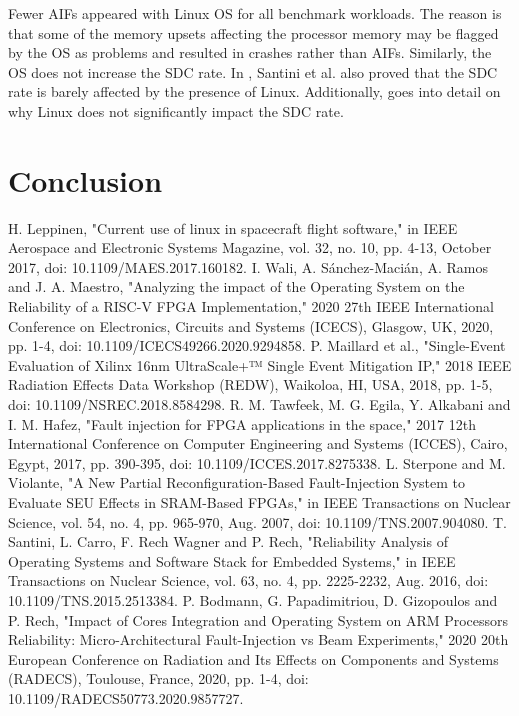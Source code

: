 \documentclass[conference]{IEEEtran}
\begin{document}
Fewer AIFs appeared with Linux OS for all benchmark workloads. The reason is that some of the memory upsets affecting the processor memory 
may be flagged by the OS as problems and resulted in crashes rather than AIFs. Similarly, the OS does not increase the SDC rate. In \cite{b6}, 
Santini et al. also proved that the SDC rate is barely affected by the presence of Linux. Additionally, \cite{b7} goes into detail on why
Linux does not significantly impact the SDC rate. 

\section{Conclusion}


\begin{thebibliography}{10}
     H. Leppinen, "Current use of linux in spacecraft flight software," in IEEE Aerospace and Electronic Systems Magazine,
     vol. 32, no. 10, pp. 4-13, October 2017, doi: 10.1109/MAES.2017.160182. 
     I. Wali, A. Sánchez-Macián, A. Ramos and J. A. Maestro, "Analyzing the impact of the Operating System on the Reliability
     of a RISC-V FPGA Implementation," 2020 27th IEEE International Conference on Electronics, Circuits and Systems (ICECS), Glasgow, UK, 2020,
    pp. 1-4, doi: 10.1109/ICECS49266.2020.9294858.
     P. Maillard et al., "Single-Event Evaluation of Xilinx 16nm UltraScale+™ Single Event Mitigation IP," 2018 IEEE Radiation 
     Effects Data Workshop (REDW), Waikoloa, HI, USA, 2018, pp. 1-5, doi: 10.1109/NSREC.2018.8584298.
     R. M. Tawfeek, M. G. Egila, Y. Alkabani and I. M. Hafez, "Fault injection for FPGA applications in the space," 2017 12th
     International Conference on Computer Engineering and Systems (ICCES), Cairo, Egypt, 2017, pp. 390-395, doi: 10.1109/ICCES.2017.8275338.
     L. Sterpone and M. Violante, "A New Partial Reconfiguration-Based Fault-Injection System to Evaluate SEU Effects in SRAM-Based
     FPGAs," in IEEE Transactions on Nuclear Science, vol. 54, no. 4, pp. 965-970, Aug. 2007, doi: 10.1109/TNS.2007.904080.
     T. Santini, L. Carro, F. Rech Wagner and P. Rech, "Reliability Analysis of Operating Systems and Software Stack for Embedded 
     Systems," in IEEE Transactions on Nuclear Science, vol. 63, no. 4, pp. 2225-2232, Aug. 2016, doi: 10.1109/TNS.2015.2513384.
     P. Bodmann, G. Papadimitriou, D. Gizopoulos and P. Rech, "Impact of Cores Integration and Operating System on ARM Processors 
     Reliability: Micro-Architectural Fault-Injection vs Beam Experiments," 2020 20th European Conference on Radiation and Its Effects on 
     Components and Systems (RADECS), Toulouse, France, 2020, pp. 1-4, doi: 10.1109/RADECS50773.2020.9857727.
\end{thebibliography}
\end{document}
